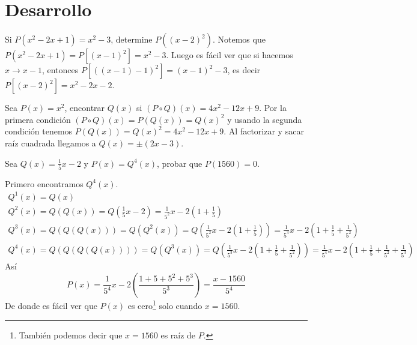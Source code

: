 \section{Desarrollo}
{
    \begin{exercise}
        Si $P(x^2 - 2x + 1) = x^2 - 3$, determine $P((x - 2)^2).$
        \solution
        {
            Notemos que $P(x^2 - 2x + 1) = P\left[ (x - 1)^2 \right] = x^2 - 3$. Luego es fácil ver que si hacemos $x \rightarrow x - 1$, entonces
            $P\left[ \left( (x - 1) - 1 \right)^2 \right] = (x - 1)^2 - 3$, es decir $P\left[ (x - 2)^2 \right] = x^2 - 2x - 2.$
        }
    \end{exercise}

    \begin{exercise}
        Sea $P(x) = x^2$, encontrar $Q(x)$ si $(P \circ Q)(x) = 4x^2 - 12x + 9$.
        \solution
        {
            Por la primera condición $(P \circ Q)(x) = P(Q(x)) = Q(x)^2$ y usando la segunda condición tenemos
            $P(Q(x)) = Q(x)^2 = 4x^2 - 12x + 9$. Al factorizar y sacar raíz cuadrada llegamos a $Q(x) = \pm (2x - 3).$
        }
    \end{exercise}

    \begin{exercise}
        Sea $Q(x) = \frac{1}{5} x - 2$ y $P(x) = Q^4(x)$, probar que $P(1560) = 0$.

        \solution
        {
            Primero encontramos $Q^4(x)$.
            \begin{align*}
                Q^1(x) = Q(x)\\
                Q^2(x) = Q(Q(x)) = Q\left( \frac{1}{5} x - 2 \right) = \frac{1}{5^2} x - 2(1 + \frac{1}{5})\\
                Q^3(x) = Q(Q(Q(x))) = Q(Q^2(x)) = Q\left(\frac{1}{5^2} x - 2(1 + \frac{1}{5})\right) =  \frac{1}{5^3} x - 2(1 + \frac{1}{5} + \frac{1}{5^2})\\
                Q^4(x) = Q(Q(Q(Q(x)))) = Q(Q^3(x)) = Q\left(\frac{1}{5^3} x - 2(1 + \frac{1}{5} + \frac{1}{5^2})\right) =  \frac{1}{5^4} x - 2(1 + \frac{1}{5} + \frac{1}{5^2} + \frac{1}{5^3})
            \end{align*}
            Así \[P(x) = \frac{1}{5^4} x - 2(\frac{1 + 5 + 5^2 + 5^3}{5^3}) = \frac{x - 1560}{5^4}\]
            De donde es fácil ver que $P(x)$ es cero\footnote{También podemos decir que $x = 1560$ es raíz de $P$.} solo cuando $x = 1560$.
        }

    \end{exercise}

}
